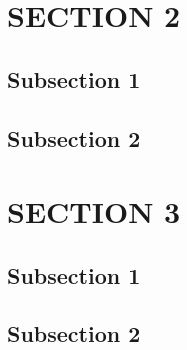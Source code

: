 \section{\uppercase{Section 2}}

\subsection{Subsection 1}

\subsection{Subsection 2}

\section{\uppercase{Section 3}}

\subsection{Subsection 1}

\subsection{Subsection 2}